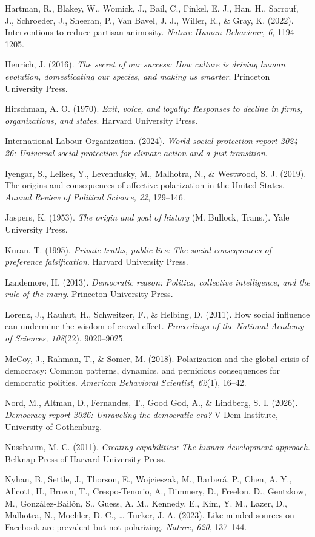 \documentclass[
  11pt,
]{article}
\begin{document}
Hartman, R., Blakey, W., Womick, J., Bail, C., Finkel, E. J., Han, H.,
Sarrouf, J., Schroeder, J., Sheeran, P., Van Bavel, J. J., Willer, R.,
\& Gray, K. (2022). Interventions to reduce partisan animosity.
\emph{Nature Human Behaviour, 6}, 1194--1205.

Henrich, J. (2016). \emph{The secret of our success: How culture is
driving human evolution, domesticating our species, and making us
smarter}. Princeton University Press.

Hirschman, A. O. (1970). \emph{Exit, voice, and loyalty: Responses to
decline in firms, organizations, and states}. Harvard University Press.

International Labour Organization. (2024). \emph{World social protection
report 2024--26: Universal social protection for climate action and a
just transition}.

Iyengar, S., Lelkes, Y., Levendusky, M., Malhotra, N., \& Westwood, S.
J. (2019). The origins and consequences of affective polarization in the
United States. \emph{Annual Review of Political Science, 22}, 129--146.

Jaspers, K. (1953). \emph{The origin and goal of history} (M. Bullock,
Trans.). Yale University Press.

Kuran, T. (1995). \emph{Private truths, public lies: The social
consequences of preference falsification}. Harvard University Press.

Landemore, H. (2013). \emph{Democratic reason: Politics, collective
intelligence, and the rule of the many}. Princeton University Press.

Lorenz, J., Rauhut, H., Schweitzer, F., \& Helbing, D. (2011). How
social influence can undermine the wisdom of crowd effect.
\emph{Proceedings of the National Academy of Sciences, 108}(22),
9020--9025.

McCoy, J., Rahman, T., \& Somer, M. (2018). Polarization and the global
crisis of democracy: Common patterns, dynamics, and pernicious
consequences for democratic polities. \emph{American Behavioral
Scientist, 62}(1), 16--42.

Nord, M., Altman, D., Fernandes, T., Good God, A., \& Lindberg, S. I.
(2026). \emph{Democracy report 2026: Unraveling the democratic era?}
V-Dem Institute, University of Gothenburg.

Nussbaum, M. C. (2011). \emph{Creating capabilities: The human
development approach}. Belknap Press of Harvard University Press.

Nyhan, B., Settle, J., Thorson, E., Wojcieszak, M., Barberá, P., Chen,
A. Y., Allcott, H., Brown, T., Crespo-Tenorio, A., Dimmery, D., Freelon,
D., Gentzkow, M., González-Bailón, S., Guess, A. M., Kennedy, E., Kim,
Y. M., Lazer, D., Malhotra, N., Moehler, D. C., \ldots{} Tucker, J. A.
(2023). Like-minded sources on Facebook are prevalent but not
polarizing. \emph{Nature, 620}, 137--144.
\end{document}
